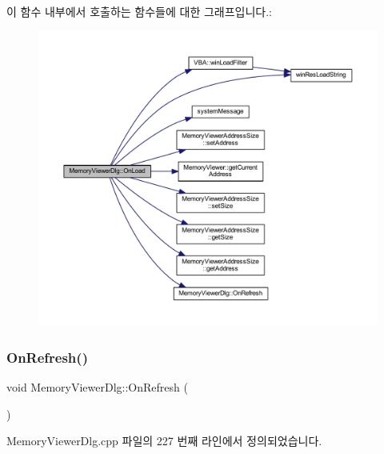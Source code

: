 이 함수 내부에서 호출하는 함수들에 대한 그래프입니다.\+:
\nopagebreak
\begin{figure}[H]
\begin{center}
\leavevmode
\includegraphics[width=350pt]{class_memory_viewer_dlg_adfc256215ade1d48a24a3eb72b3ecfed_cgraph}
\end{center}
\end{figure}
\mbox{\label{class_memory_viewer_dlg_a2c10fa49648424e4994c8c5a71f4effc}} 
\subsubsection{\texorpdfstring{On\+Refresh()}{OnRefresh()}}
{\footnotesize\ttfamily void Memory\+Viewer\+Dlg\+::\+On\+Refresh (\begin{DoxyParamCaption}{ }\end{DoxyParamCaption})\hspace{0.3cm}{\ttfamily [protected]}}



Memory\+Viewer\+Dlg.\+cpp 파일의 227 번째 라인에서 정의되었습니다.


